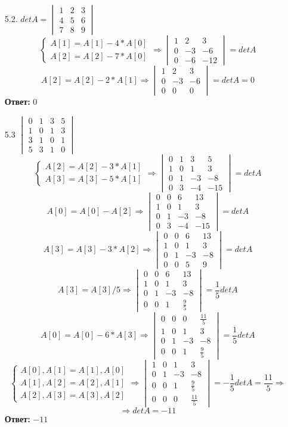 \documentclass[a4paper]{article}
\renewcommand{\det}[1]{\begin{vmatrix} #1 \end{vmatrix}}
\renewcommand{\f}[2]{\frac{#1}{#2}}
\newcommand{\case}[1]{\begin{cases} #1 \end{cases}}
\renewcommand{\r}{\Rightarrow}
\begin{document}
\begin{enumerate}
\begin{enumerate}
        \item[5.2.]$detA = \det{1 & 2 & 3 \\ 4 & 5 & 6 \\ 7 & 8 & 9}$
        \[\begin{cases}A[1] = A[1]-4*A[0]\\ A[2] = A[2]-7*A[0]\end{cases} \r \det{1 & 2 & 3 \\ 0 & -3 & -6 \\ 0 & -6 & -12} = detA\]
        $$A[2] = A[2]-2*A[1] \r \det{1 & 2 & 3 \\ 0 & -3 & -6 \\ 0 & 0 & 0} = detA = 0$$
        \textbf{Ответ: }$0$\\

        \item[5.3]$\det{0 & 1 & 3 & 5 \\ 1& 0 & 1 & 3 \\ 3 & 1 & 0 & 1 \\ 5 & 3 & 1 & 0}$
        $$\case{A[2] = A[2] - 3*A[1]\\
        A[3] = A[3] - 5*A[1]} \r \det{0 & 1 & 3 & 5 \\ 1 & 0 & 1 & 3 \\ 0 & 1 & -3 & -8 \\ 0 & 3 & -4 & -15} = detA$$
        $$A[0] = A[0] - A[2] \r \det{0 & 0 & 6 & 13 \\ 1 & 0 & 1 & 3 \\ 0 & 1 & -3 & -8 \\ 0 & 3 & -4 & -15} = detA$$
        $$A[3] = A[3] - 3*A[2] \r \det{0 & 0 & 6 & 13 \\ 1 & 0 & 1 & 3 \\ 0 & 1 & -3 & -8 \\ 0 & 0 & 5 & 9} = detA$$
        $$A[3] = A[3]/5 \r\det{0 & 0 & 6 & 13 \\ 1 & 0 & 1 & 3 \\ 0 & 1 & -3 & -8 \\ 0 & 0 & 1 & \frac{9}{5}} = \f{1}{5}detA$$
        $$A[0] = A[0] - 6*A[3] \r \det{0 & 0 & 0 & \frac{11}{5} \\ 1 & 0 & 1 & 3 \\ 0 & 1 & -3 & -8 \\ 0 & 0 & 1 & \frac{9}{5}} = \f{1}{5}detA$$
        $$\case{A[0], A[1] = A[1], A[0]\\
        A[1], A[2]= A[2], A[1]\\
        A[2], A[3] = A[3], A[2]} \r \det{1 & 0 & 1 & 3 \\ 0 & 1 & -3 & -8 \\0 & 0 & 1 & \frac{9}{5} \\ 0 & 0 & 0 & \frac{11}{5}} = -\f{1}{5}detA = \f{11}{5} \r$$
        $$\r detA = -11$$
        \textbf{Ответ: } $-11$
    \end{enumerate}
    

\end{enumerate}
\end{document}
